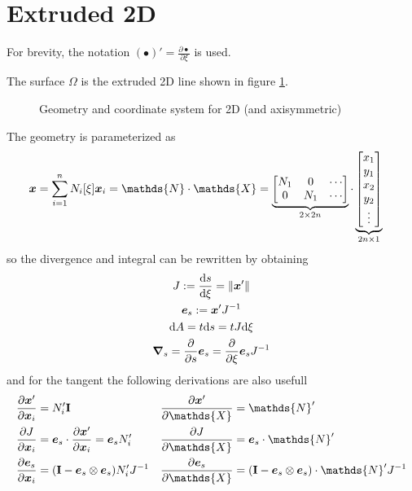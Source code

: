\documentclass[a4paper,11pt]{article}
\renewcommand{\to}[1]{\text{\boldmath $#1$}} %
\newcommand{\ts}[1]{\text{\boldmath $\mathrm{#1}$}} %
\newcommand{\uv}[1]{\mathds{#1}}
\newcommand{\um}[1]{\mathds{#1}}
\newcommand{\intd}[1]{\mathrm{d}#1}
\newcommand{\pderiv}[2]{\frac{\partial#1}{\partial#2}}
\newcommand{\dderiv}[2]{\frac{\mathrm{d}#1}{\mathrm{d}#2}}
\newcommand{\norm}[1]{\left\lVert{#1}\right\rVert}
\newcommand{\defeq}{:=}
\begin{document}
\section{Extruded 2D}
For brevity, the notation $(\bullet)' = \pderiv{\bullet}{\xi}$ is used.

The surface $\Omega$ is the extruded 2D line shown in figure \ref{fig:extruded}.
\begin{figure}[htpb]
 \centering
 \caption{Geometry and coordinate system for 2D (and axisymmetric)}
 \label{fig:extruded}
\end{figure}

The geometry is parameterized as
\begin{align}
 \to x &= \sum_{i=1}^n N_i[\xi]\to x_i
  = \um N \cdot \uv X
  = \underbrace{\begin{bmatrix}N_1 & 0 & \cdots\\ 0 & N_1 & \cdots \end{bmatrix}}_{2\times 2n}\cdot \underbrace{\begin{bmatrix}x_1\\y_1\\x_2\\y_2\\ \vdots\end{bmatrix}}_{2n\times 1}
\end{align}
so the divergence and integral can be rewritten by obtaining
\begin{gather}
 J \defeq \dderiv{s}{\xi} = \norm{\to x'}\\
 \to e_s \defeq \to x' J^{-1}\\
 \intd A = t \intd s = t J \intd \xi     \label{eq:intdA_2d}\\
 \to \nabla_s = \pderiv{}{s}\to e_s = \pderiv{}{\xi}\to e_s J^{-1}    \label{eq:nabla_s_2d}
\end{gather}
and for the tangent the following derivations are also usefull
\begin{align}
 \pderiv{\to x'}{\to x_i} &= N_i' \ts I & \pderiv{\to x'}{\uv X} &= \um N'\\
 \pderiv{J}{\to x_i} &= \to e_s \cdot \pderiv{\to x'}{\to x_i} = \to e_s N_i'  & \pderiv{J}{\uv X} &= \to e_s\cdot \um N' \\
 \pderiv{\to e_s}{\to x_i} &= (\ts I - \to e_s\otimes\to e_s)N_i' J^{-1} &  \pderiv{\to e_s}{\uv X} &= (\ts I - \to e_s\otimes \to e_s)\cdot \um N' J^{-1}
\end{align}
\end{document}

